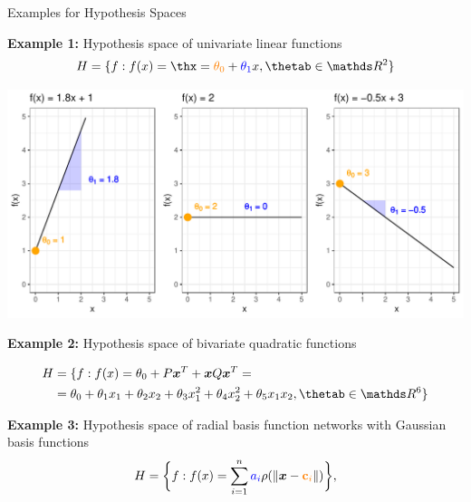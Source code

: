 \documentclass[11pt,compress,t,notes=noshow, xcolor=table]{beamer}
\begin{document}

\begin{vbframe}{Examples for Hypothesis Spaces}

\textbf{Example 1:} Hypothesis space of univariate linear functions
$$\Hspace = \{f: \fx = \thx =  \textcolor{orange}{\theta_0} + 
\textcolor{blue}{\theta_1} x, \thetab \in \R^2\}$$

\begin{center}
  \includegraphics[width = \textwidth]{figure/hs-lin-functions.pdf}
\end{center}

\framebreak

\textbf{Example 2:} Hypothesis space of bivariate quadratic functions

\begin{equation*}
  \begin{split}
    \Hspace &= \{f: \fx =  \theta_0 + P \xv^T + \xv Q \xv^T =  \\
    &= \theta_0 + \theta_1 x_1 + \theta_2 x_2 + \theta_3 x_1^2 + \theta_4 x_2^2 + 
    \theta_5 x_1 x_2, \thetab \in \R^6\}
  \end{split}
\end{equation*}

\framebreak

\textbf{Example 3:} Hypothesis space of radial basis function networks with
Gaussian basis functions
$$H = \bigg\{ f: f(x) =  \sum_{i=1}^n \textcolor{blue}{a_i} \rho ( \| \bm{x} - 
\textcolor{orange}{\textbf{c}_i}  \|) 
\bigg\},$$ 


\end{vbframe}
\end{document}

